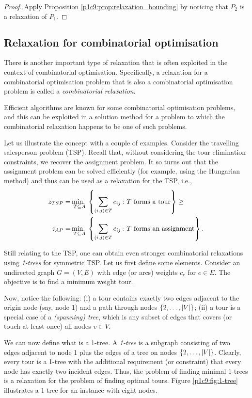 \begin{proof}
	Apply Proposition \ref{p1c9:prop:relaxation_bounding} by noticing that $P_2$ is a relaxation of $P_1$. 
\end{proof}


\subsection{Relaxation for combinatorial optimisation}

There is another important type of relaxation that is often exploited in the context of combinatorial optimisation. Specifically, a relaxation for a combinatorial optimisation problem that is also a combinatorial optimisation problem is called a \emph{combinatorial relaxation}.

Efficient algorithms are known for some combinatorial optimisation problems, and this can be exploited in a solution method for a problem to which the combinatorial relaxation happens to be one of such problems. 

Let us illustrate the concept with a couple of examples. Consider the travelling salesperson problem (TSP). Recall that, without considering the tour elimination constraints, we recover the assignment problem. It so turns out that the assignment problem can be solved efficiently (for example, using the Hungarian method) and thus can be used as a relaxation for the TSP, i.e.,
%
\begin{align*}
	z_{TSP} = &\mathop{\text{min.~}}_{T\subseteq A}\left\{ \sum_{(i,j)\in T} c_{ij} : T \text{ forms a tour} \right \} \geq \\
	z_{AP} = &\mathop{\text{min.~}}_{T\subseteq A}\left\{ \sum_{(i,j)\in T} c_{ij} : T \text{ forms an assignment} \right \}. 
\end{align*}
%

Still relating to the TSP, one can obtain even stronger combinatorial relaxations using \emph{1-trees} for symmetric TSP. Let us first define some elements.  Consider an undirected graph $G = (V,E)$ with edge (or arcs) weights $c_e$ for $e \in E$. The objective is to find a minimum weight tour.

Now, notice the following: (i) a tour contains exactly two edges adjacent to the origin node (say, node 1) and a path through nodes $\left\{ 2, \dots, |V| \right \}$; (ii) a tour is a special case of a \emph{(spanning) tree}, which is any subset of edges that covers (or touch at least once) all nodes $v \in V$. 

We can now define what is a 1-tree. A \emph{1-tree} is a subgraph consisting of two edges adjacent to node 1 plus the edges of a tree on nodes $\left\{ 2, \dots, |V| \right \}$. Clearly, every tour is a 1-tree with the additional requirement (or constraint) that every node has exactly two incident edges. Thus, the problem of finding minimal 1-trees is a relaxation for the problem of finding optimal tours. Figure \ref{p1c9:fig:1-tree} illustrates a 1-tree for an instance with eight nodes.

